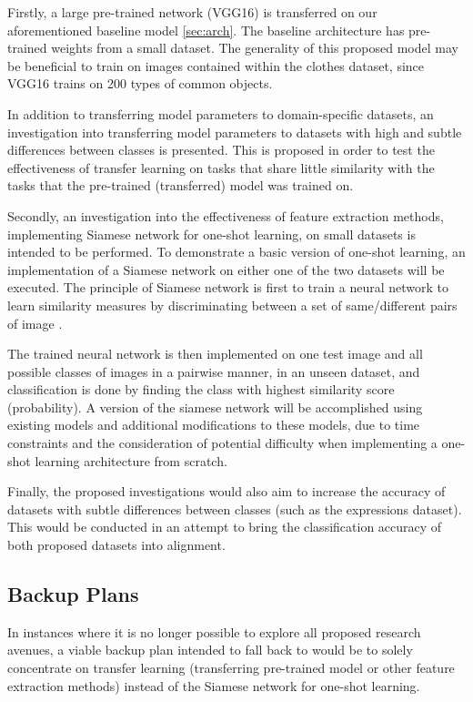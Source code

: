 \documentclass{article}
\begin{document}
Firstly, a large pre-trained network (VGG16) \cite{DBLP:journals/corr/SimonyanZ14a} is transferred on our aforementioned baseline model \ref{sec:arch}. The baseline architecture has pre-trained weights from a small dataset. The generality of this proposed model may be beneficial to train on images contained within the clothes dataset, since VGG16 trains on 200 types of common objects. 

In addition to transferring model parameters to domain-specific datasets, an investigation into transferring model parameters to datasets with high and subtle differences between classes is presented. This is proposed in order to test the effectiveness of transfer learning on tasks that share little similarity with the tasks that the pre-trained (transferred) model was trained on.

Secondly, an investigation into the effectiveness of feature extraction methods, implementing Siamese network for one-shot learning, on small datasets is intended to be performed. To demonstrate a basic version of one-shot learning, an implementation of a Siamese network \cite{bromley1994signature} on either one of the two datasets will be executed. The principle of Siamese network is first to train a neural network to learn similarity measures by discriminating between a set of same/different pairs of image \cite{koch}. 

The trained neural network is then implemented on one test image and all possible classes of images in a pairwise manner, in an unseen dataset, and classification is done by finding the class with highest similarity score (probability).   A version of the siamese network will be accomplished using existing models and additional modifications to these models, due to time constraints and the consideration of potential difficulty when implementing a one-shot learning architecture from scratch.

Finally, the proposed investigations would also aim to increase the accuracy of datasets with subtle differences between classes (such as the expressions dataset). This would be conducted in an attempt to bring the classification accuracy of both proposed datasets into alignment.

\subsection{Backup Plans}
\label{sec:plans}

In instances where it is no longer possible to explore all proposed research avenues, a viable backup plan intended to fall back to would be to solely concentrate on transfer learning (transferring pre-trained model or other feature extraction methods) instead of the Siamese network for one-shot learning. 



\end{document}
